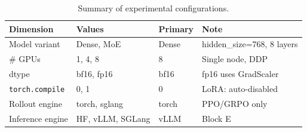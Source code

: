 \begin{table}[h]
\centering
\caption{Summary of experimental configurations.}
\label{tab:configs}
\small
\begin{tabular}{llll}
\toprule
\textbf{Dimension} & \textbf{Values} & \textbf{Primary} & \textbf{Note} \\
\midrule
Model variant & Dense, MoE & Dense & hidden\_size=768, 8 layers \\
\# GPUs & 1, 4, 8 & 8 & Single node, DDP \\
dtype & bf16, fp16 & bf16 & fp16 uses GradScaler \\
\texttt{torch.compile} & 0, 1 & 0 & LoRA: auto-disabled \\
Rollout engine & torch, sglang & torch & PPO/GRPO only \\
Inference engine & HF, vLLM, SGLang & vLLM & Block E \\
\bottomrule
\end{tabular}
\end{table}
